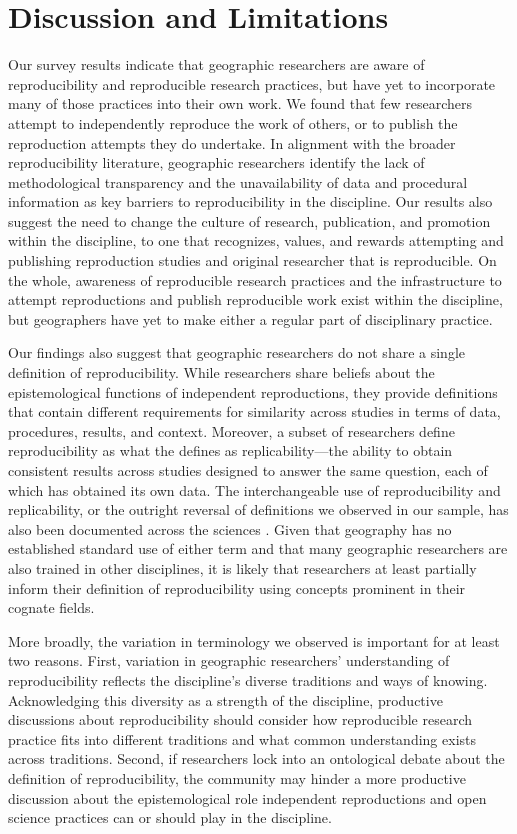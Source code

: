 \documentclass[]{interact}
\newcommand{\citep}{\parencite}
\theoremstyle{plain}%
\theoremstyle{definition}
\theoremstyle{remark}
\begin{document}
\section*{Discussion and Limitations}
Our survey results indicate that geographic researchers are aware of reproducibility and reproducible research practices, but have yet to incorporate many of those practices into their own work. 
We found that few researchers attempt to independently reproduce the work of others, or to publish the reproduction attempts they do undertake.
In alignment with the broader reproducibility literature, geographic researchers identify the lack of methodological transparency and the unavailability of data and procedural information as key barriers to reproducibility in the discipline. 
Our results also suggest the need to change the culture of research, publication, and promotion within the discipline, to one that recognizes, values, and rewards attempting and publishing reproduction studies and original researcher that is reproducible.  
On the whole, awareness of reproducible research practices and the infrastructure to attempt reproductions and publish reproducible work exist within the discipline, but geographers have yet to make either a regular part of disciplinary practice. 

Our findings also suggest that geographic researchers do not share a single definition of reproducibility. 
While researchers share beliefs about the epistemological functions of independent reproductions, they provide definitions that contain different requirements for similarity across studies in terms of data, procedures, results, and context.  
Moreover, a subset of researchers define reproducibility as what the \textcite{NASEM2019} defines as replicability---the ability to obtain consistent results across studies designed to answer the same question, each of which has obtained its own data.
The interchangeable use of reproducibility and replicability, or the outright reversal of definitions we observed in our sample, has also been documented across the sciences \citep{barba2018terminologies, plesser2018reproducibility}. 
Given that geography has no established standard use of either term and that many geographic researchers are also trained in other disciplines, it is likely that researchers at least partially inform their definition of reproducibility using concepts prominent in their cognate fields.

More broadly, the variation in terminology we observed is important for at least two reasons. 
First, variation in geographic researchers' understanding of reproducibility reflects the discipline's diverse traditions and ways of knowing. 
Acknowledging this diversity as a strength of the discipline, productive discussions about reproducibility should consider how reproducible research practice fits into different traditions and what common understanding exists across traditions. 
Second, if researchers lock into an ontological debate about the definition of reproducibility, the community may hinder a more productive discussion about the epistemological role independent reproductions and open science practices can or should play in the discipline. 
\end{document}

